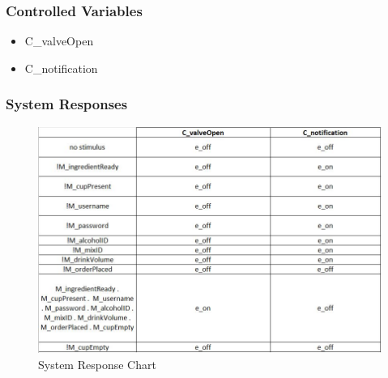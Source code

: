 \documentclass{article}
\begin{document}
\subsubsection{Controlled Variables} %
    \begin{itemize}
        \item C\_valveOpen
        \item C\_notification
    \end{itemize}
\subsubsection{System Responses}
    
    \begin{figure}[H]
    \centerline{\includegraphics[scale=0.9]{SystemResponse.JPG}}
    \caption{System Response Chart}
    \label{fig}
    \end{figure}
\end{document}
